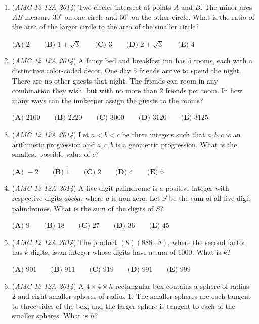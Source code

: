 \begin{enumerate}
 $\textbf{(A) }140\qquad \textbf{(B) }175\qquad \textbf{(C) }210\qquad \textbf{(D) }245\qquad \textbf{(E) }280\qquad$


	\item (\textit{AMC 12 12A 2014}) Two circles intersect at points $A$ and $B$.  The minor arcs $AB$ measure $30^\circ$ on one circle and $60^\circ$ on the other circle.  What is the ratio of the area of the larger circle to the area of the smaller circle?


 $\textbf{(A) }2\qquad \textbf{(B) }1+\sqrt3\qquad \textbf{(C) }3\qquad \textbf{(D) }2+\sqrt3\qquad \textbf{(E) }4\qquad$


	\item (\textit{AMC 12 12A 2014}) A fancy bed and breakfast inn has $5$ rooms, each with a distinctive color-coded decor.  One day $5$ friends arrive to spend the night.  There are no other guests that night.  The friends can room in any combination they wish, but with no more than $2$ friends per room.  In how many ways can the innkeeper assign the guests to the rooms?


 $\textbf{(A) }2100\qquad \textbf{(B) }2220\qquad \textbf{(C) }3000\qquad \textbf{(D) }3120\qquad \textbf{(E) }3125\qquad$


	\item (\textit{AMC 12 12A 2014}) Let $a<b<c$ be three integers such that $a,b,c$ is an arithmetic progression and $a,c,b$ is a geometric progression.  What is the smallest possible value of $c$?


 $\textbf{(A) }-2\qquad \textbf{(B) }1\qquad \textbf{(C) }2\qquad \textbf{(D) }4\qquad \textbf{(E) }6\qquad$


	\item (\textit{AMC 12 12A 2014}) A five-digit palindrome is a positive integer with respective digits $abcba$, where $a$ is non-zero.  Let $S$ be the sum of all five-digit palindromes.  What is the sum of the digits of $S$?


 $\textbf{(A) }9\qquad \textbf{(B) }18\qquad \textbf{(C) }27\qquad \textbf{(D) }36\qquad \textbf{(E) }45\qquad$


	\item (\textit{AMC 12 12A 2014}) The product $(8)(888\ldots 8)$, where the second factor has $k$ digits, is an integer whose digits have a sum of $1000$.  What is $k$?


 $\textbf{(A) }901\qquad \textbf{(B) }911\qquad \textbf{(C) }919\qquad \textbf{(D) }991\qquad \textbf{(E) }999\qquad$


	\item (\textit{AMC 12 12A 2014}) A $4\times 4\times h$ rectangular box contains a sphere of radius $2$ and eight smaller spheres of radius $1$.  The smaller spheres are each tangent to three sides of the box, and the larger sphere is tangent to each of the smaller spheres.  What is $h$?



\end{enumerate}
